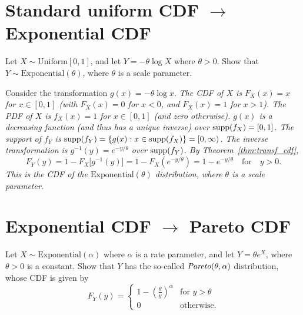 \section{Standard uniform CDF $\longrightarrow$ Exponential CDF}
\begin{example}
Let $X\sim\text{Uniform}[0,1]$, and let $Y = -\theta\log X$ where $\theta>0$. Show that $Y\sim\text{Exponential}(\theta)$, where $\theta$ is a scale parameter.
\end{example}
\begin{solution}
Consider the transformation $g(x) = -\theta\log x$.
\bit
\it The CDF of $X$ is $F_X(x) = x$ for $x\in[0,1]$ (with $F_X(x)=0$ for $x<0$, and $F_X(x)=1$ for $x>1$).
\it The PDF of $X$ is $f_X(x) = 1$ for $x\in[0,1]$ (and zero otherwise).
\it $g(x)$ is a decreasing function (and thus has a unique inverse) over $\text{supp}(f_X) = [0,1]$.
\it The support of $f_Y$ is $\text{supp}(f_Y) = \{g(x) : x\in\text{supp}(f_X)\} = [0,\infty)$.
\it The inverse transformation is $g^{-1}(y) = e^{-y/\theta}$ over $\text{supp}(f_Y)$.
\eit
By Theorem~\ref{thm:transf_cdf},
\[
F_Y(y) 
	= 1 - F_X\big[g^{-1}(y)\big]
	= 1 - F_X(e^{-y/\theta})
	= 1 - e^{-y/\theta} \quad\text{for}\quad y>0.
\]
This is the CDF of the $\text{Exponential}(\theta)$ distribution, where $\theta$ is a scale parameter.
\end{solution}

\section{Exponential CDF $\longrightarrow$ Pareto CDF}

\begin{example}
Let $X\sim\text{Exponential}(\alpha)$ where $\alpha$ is a rate parameter, and let $Y=\theta e^X$, where $\theta>0$ is a constant. Show that $Y$ has the so-called $\text{\emph{Pareto}}(\theta,\alpha)$ distribution, whose CDF is given by
\[
F_Y(y)= \begin{cases}
		1 - \left(\frac{\theta}{y}\right)^{\alpha}	& \text{for } y > \theta \\
		0											& \text{otherwise.}
	\end{cases}	
\]
\end{example}


